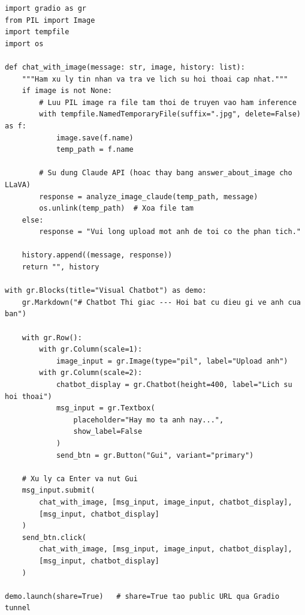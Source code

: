 \begin{verbatim}
import gradio as gr
from PIL import Image
import tempfile
import os

def chat_with_image(message: str, image, history: list):
    """Ham xu ly tin nhan va tra ve lich su hoi thoai cap nhat."""
    if image is not None:
        # Luu PIL image ra file tam thoi de truyen vao ham inference
        with tempfile.NamedTemporaryFile(suffix=".jpg", delete=False) as f:
            image.save(f.name)
            temp_path = f.name

        # Su dung Claude API (hoac thay bang answer_about_image cho LLaVA)
        response = analyze_image_claude(temp_path, message)
        os.unlink(temp_path)  # Xoa file tam
    else:
        response = "Vui long upload mot anh de toi co the phan tich."

    history.append((message, response))
    return "", history

with gr.Blocks(title="Visual Chatbot") as demo:
    gr.Markdown("# Chatbot Thi giac --- Hoi bat cu dieu gi ve anh cua ban")

    with gr.Row():
        with gr.Column(scale=1):
            image_input = gr.Image(type="pil", label="Upload anh")
        with gr.Column(scale=2):
            chatbot_display = gr.Chatbot(height=400, label="Lich su hoi thoai")
            msg_input = gr.Textbox(
                placeholder="Hay mo ta anh nay...",
                show_label=False
            )
            send_btn = gr.Button("Gui", variant="primary")

    # Xu ly ca Enter va nut Gui
    msg_input.submit(
        chat_with_image, [msg_input, image_input, chatbot_display],
        [msg_input, chatbot_display]
    )
    send_btn.click(
        chat_with_image, [msg_input, image_input, chatbot_display],
        [msg_input, chatbot_display]
    )

demo.launch(share=True)   # share=True tao public URL qua Gradio tunnel
\end{verbatim}

